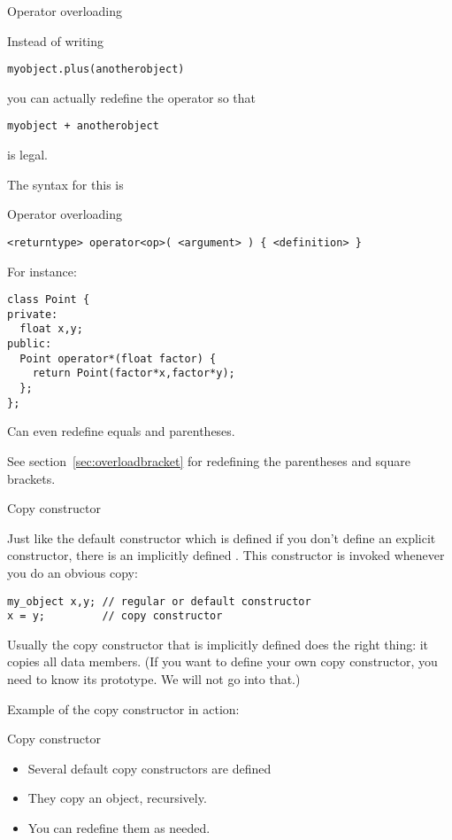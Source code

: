  {Operator overloading}
\label{sec:operatordef}

Instead of writing 
\begin{verbatim}
myobject.plus(anotherobject)
\end{verbatim}
you can actually redefine the \n{+} operator so that
\begin{verbatim}
myobject + anotherobject
\end{verbatim}
is legal.

The syntax for this is
\begin{block}{Operator overloading}
  \label{sl:object-operator}
\begin{verbatim}
<returntype> operator<op>( <argument> ) { <definition> }
\end{verbatim}
For instance:
\begin{verbatim}
class Point {
private:
  float x,y;
public:
  Point operator*(float factor) {
    return Point(factor*x,factor*y);
  };
};
\end{verbatim}
Can even redefine equals and parentheses.
\end{block}

See section~\ref{sec:overloadbracket} for redefining the parentheses
and square brackets.

 {Copy constructor}

Just like the default constructor which is defined if you don't define
an explicit constructor, there is an implicitly defined
. This constructor is invoked whenever
you do an obvious copy:
\begin{verbatim}
my_object x,y; // regular or default constructor
x = y;         // copy constructor
\end{verbatim}
Usually the copy constructor that is implicitly defined does the right
thing: it copies all data members. (If you want to define your own copy
constructor, you need to know its prototype. We will not go into that.)

Example of the copy constructor in action:
%

\begin{slide}{Copy constructor}
  \label{sl:class-copy}
  \begin{multicols}{2}
    \begin{itemize}
    \item
      Several default copy constructors are defined
    \item They copy an object, recursively.
    \item You can redefine them as needed.
    \end{itemize}
    \vfill\columnbreak
  \end{multicols}
\end{slide}


